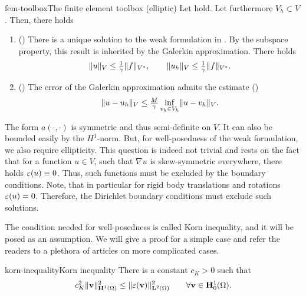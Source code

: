 \begin{Theorem*}{fem-toolbox}{The finite element toolbox (elliptic)}
  Let  hold. Let furthermore
  $V_h\subset V$. Then, there holds
  \begin{enumerate}
  \item () There is a unique solution to
    the weak formulation in
    . By the subspace
    property, this result is inherited by the Galerkin
    approximation. There holds
    \begin{gather}
      \lVert u\rVert_V \le \tfrac1{\gamma} \lVert f\rVert_{V^*},
      \qquad
      \lVert u_h\rVert_V \le \tfrac1{\gamma} \lVert f\rVert_{V^*}.
    \end{gather}
  \item () The error of the Galerkin
    approximation admits the estimate ()
    \begin{gather}
      \lVert u-u_h\rVert_V \le \tfrac{M}{\gamma}\inf_{v_h\in V_h}\lVert u-v_h\rVert_V.
    \end{gather}
  \end{enumerate}
\end{Theorem*}

\begin{intro}
  The form $a(\cdot,\cdot)$ is symmetric and thus semi-definite on $V$. It can
  also be bounded easily by the $H^1$-norm. But, for well-posedness of
  the weak formulation, we also require ellipticity. This question is
  indeed not trivial and rests on the fact that for a function
  $u\in V$, such that $\nabla u$ is skew-symmetric everywhere, there
  holds $\varepsilon(u)\equiv 0$. Thus, such functions must be excluded by
  the boundary conditions. Note, that in particular for rigid body
  translations and rotations $\varepsilon(u) = 0$. Therefore, the Dirichlet
  boundary conditions must exclude such solutions.
  
  The condition needed for well-posedness is called Korn inequality,
  and it will be posed as an assumption. We will give a proof for a
  simple case and refer the readers to a plethora of articles on more
  complicated cases.
\end{intro}

\begin{Lemma*}{korn-inequality}{Korn inequality}
  There is a constant $c_K>0$ such that
  \begin{gather}
    \label{eq:mixedintro:korn}
    c_K^2 \lVert\mathbf v\rVert_{\mathbf H^1(\Omega)}^2
    \le \lVert\varepsilon(\mathbf v)\rVert_{\mathbf L^2(\Omega)}^2
    \qquad\forall \mathbf v\in \mathbf H^1_0(\Omega).
  \end{gather}
\end{Lemma*}

